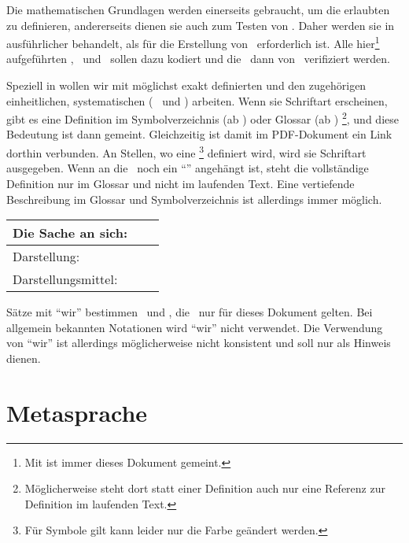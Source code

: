 Die mathematischen Grundlagen werden einerseits gebraucht, um die erlaubten \Beweisschritte{} zu definieren, andererseits dienen sie auch zum Testen von \ASBA.
Daher werden sie in  ausführlicher behandelt, als für die Erstellung von \ASBA\ erforderlich ist.
Alle hier\footnote{Mit  ist immer dieses Dokument gemeint.} aufgeführten \Axiome, \Saetze\ und \Beweise\ sollen dazu kodiert und die \Beweise\ dann von \ASBA\ verifiziert werden.

Speziell in  wollen wir mit möglichst exakt definierten  und den zugehörigen einheitlichen, systematischen  (\textdh\  und \Symbolen) arbeiten.
Wenn sie  Schriftart erscheinen, gibt es eine Definition im Symbolverzeichnis (ab ) oder Glossar (ab )%
\footnote{%
	Möglicherweise steht dort statt einer Definition auch nur eine Referenz zur Definition im laufenden Text.
},
und diese Bedeutung ist dann gemeint.
Gleichzeitig ist damit im PDF-Dokument ein Link dorthin verbunden.
An Stellen, wo eine \Benennung\footnote{Für Symbole gilt kann leider nur die Farbe geändert werden.} definiert wird, wird sie  Schriftart ausgegeben.
Wenn an die \Benennung\ noch ein "`\GD"' angehängt ist, steht die vollständige Definition nur im Glossar und nicht im laufenden Text.
Eine vertiefende Beschreibung im Glossar und Symbolverzeichnis ist allerdings immer möglich.

\begin{center}
	\begin{tabular}{|l|c|c|}
		\hline
		Die Sache an sich:  & \multicolumn{2}{c|}{\Begriff}     \\
		\hline
		Darstellung:        & \multicolumn{2}{c|}{\Bezeichnung} \\
		Darstellungsmittel: & \Benennung      & \Symbol         \\
		\hline
	\end{tabular}
\end{center}

Sätze mit "`wir"' bestimmen \Begriffe\ und \Bezeichnungen, die \textevtl\ nur für dieses Dokument gelten.
Bei allgemein bekannten Notationen wird "`wir"' nicht verwendet.
Die Verwendung von "`wir"' ist allerdings möglicherweise nicht konsistent und soll nur als Hinweis dienen.

\section     {Metasprache}%
\label   {sec:Metasprache}


